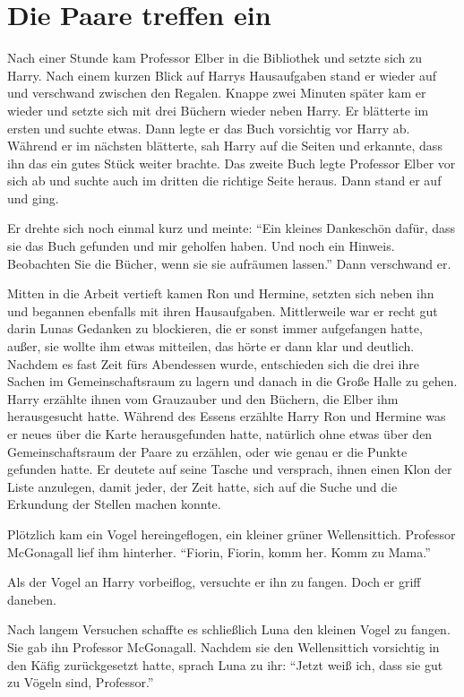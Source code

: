 \chapter{Die Paare treffen ein}


Nach einer Stunde kam Professor Elber in die Bibliothek und setzte sich zu Harry. Nach einem kurzen Blick auf Harrys Hausaufgaben stand er wieder auf und verschwand zwischen den Regalen. Knappe zwei Minuten später kam er wieder und setzte sich mit drei Büchern wieder neben Harry. Er blätterte im ersten und suchte etwas. Dann legte er das Buch vorsichtig vor Harry ab. Während er im nächsten blätterte, sah Harry auf die Seiten und erkannte, dass ihn das ein gutes Stück weiter brachte. Das zweite Buch legte Professor Elber vor sich ab und suchte auch im dritten die richtige Seite heraus. Dann stand er auf und ging.

Er drehte sich noch einmal kurz und meinte: \enquote{Ein kleines Dankeschön dafür, dass sie das Buch gefunden und mir geholfen haben. \gst Und noch ein Hinweis. Beobachten Sie die Bücher, wenn sie sie aufräumen lassen.} Dann verschwand er.

Mitten in die Arbeit vertieft kamen Ron und Hermine, setzten sich neben ihn und begannen ebenfalls mit ihren Hausaufgaben. Mittlerweile war er recht gut darin Lunas Gedanken zu blockieren, die er sonst immer aufgefangen hatte, außer, sie wollte ihm etwas mitteilen, das hörte er dann klar und deutlich. Nachdem es fast Zeit fürs Abendessen wurde, entschieden sich die drei ihre Sachen im Gemeinschaftsraum zu lagern und danach in die Große Halle zu gehen. Harry erzählte ihnen vom Grauzauber und den Büchern, die Elber ihm herausgesucht hatte. Während des Essens erzählte Harry Ron und Hermine was er neues über die Karte herausgefunden hatte, natürlich ohne etwas über den Gemeinschaftsraum der Paare zu erzählen, oder wie genau er die Punkte gefunden hatte. Er deutete auf seine Tasche und versprach, ihnen einen Klon der Liste anzulegen, damit jeder, der Zeit hatte, sich auf die Suche und die Erkundung der Stellen machen konnte.

Plötzlich kam ein Vogel hereingeflogen, ein kleiner grüner Wellensittich. Professor McGonagall lief ihm hinterher. \enquote{Fiorin, Fiorin, komm her. Komm zu Mama.}

Als der Vogel an Harry vorbeiflog, versuchte er ihn zu fangen. Doch er griff daneben.

Nach langem Versuchen schaffte es schließlich Luna den kleinen Vogel zu fangen. Sie gab ihn Professor McGonagall. Nachdem sie den Wellensittich vorsichtig in den Käfig zurückgesetzt hatte, sprach Luna zu ihr: \enquote{Jetzt weiß ich, dass sie gut zu Vögeln sind, Professor.}

